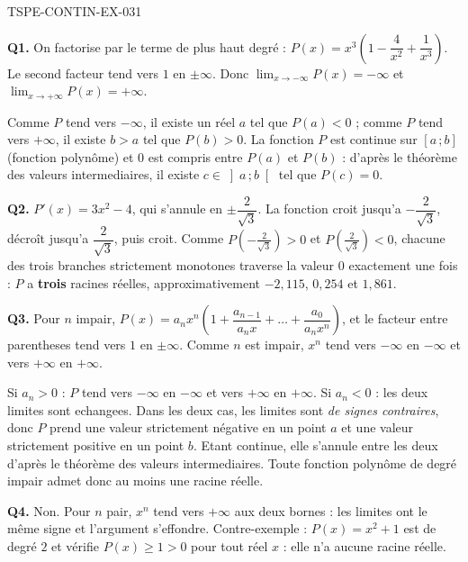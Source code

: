 \begin{corrige}{TSPE-CONTIN-EX-031}

\textbf{Q1.} On factorise par le terme de plus haut degré : $P(x) = x^3\left(1 - \dfrac{4}{x^2} + \dfrac{1}{x^3}\right)$. Le second facteur tend vers $1$ en $\pm\infty$. Donc $\displaystyle\lim_{x \to -\infty}P(x) = -\infty$ et $\displaystyle\lim_{x \to +\infty}P(x) = +\infty$.

Comme $P$ tend vers $-\infty$, il existe un réel $a$ tel que $P(a) < 0$ ; comme $P$ tend vers $+\infty$, il existe $b > a$ tel que $P(b) > 0$. La fonction $P$ est continue sur $[a\,;b]$ (fonction polynôme) et $0$ est compris entre $P(a)$ et $P(b)$ : d'après le théorème des valeurs intermediaires, il existe $c \in \left]a\,;b\right[$ tel que $P(c) = 0$.

\textbf{Q2.} $P'(x) = 3x^2 - 4$, qui s'annule en $\pm\dfrac{2}{\sqrt{3}}$. La fonction croit jusqu'a $-\dfrac{2}{\sqrt{3}}$, décroît jusqu'a $\dfrac{2}{\sqrt{3}}$, puis croit. Comme $P\!\left(-\tfrac{2}{\sqrt3}\right) > 0$ et $P\!\left(\tfrac{2}{\sqrt3}\right) < 0$, chacune des trois branches strictement monotones traverse la valeur $0$ exactement une fois : $P$ a \textbf{trois} racines réelles, approximativement $-2{,}115$, $0{,}254$ et $1{,}861$.

\textbf{Q3.} Pour $n$ impair, $P(x) = a_n x^n\left(1 + \dfrac{a_{n-1}}{a_n x} + \dots + \dfrac{a_0}{a_n x^n}\right)$, et le facteur entre parentheses tend vers $1$ en $\pm\infty$. Comme $n$ est impair, $x^n$ tend vers $-\infty$ en $-\infty$ et vers $+\infty$ en $+\infty$.

Si $a_n > 0$ : $P$ tend vers $-\infty$ en $-\infty$ et vers $+\infty$ en $+\infty$. Si $a_n < 0$ : les deux limites sont echangees. Dans les deux cas, les limites sont \emph{de signes contraires}, donc $P$ prend une valeur strictement négative en un point $a$ et une valeur strictement positive en un point $b$. Etant continue, elle s'annule entre les deux d'après le théorème des valeurs intermediaires. Toute fonction polynôme de degré impair admet donc au moins une racine réelle.

\textbf{Q4.} Non. Pour $n$ pair, $x^n$ tend vers $+\infty$ aux deux bornes : les limites ont le même signe et l'argument s'effondre. Contre-exemple : $P(x) = x^2 + 1$ est de degré $2$ et vérifie $P(x) \geq 1 > 0$ pour tout réel $x$ : elle n'a aucune racine réelle.
\end{corrige}
